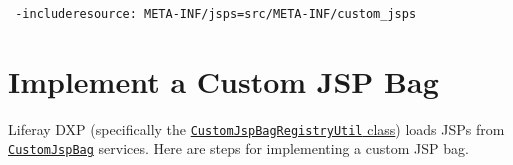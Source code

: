\begin{verbatim}
 -includeresource: META-INF/jsps=src/META-INF/custom_jsps
\end{verbatim}

\noindent\hrulefill

\section{Implement a Custom JSP Bag}\label{implement-a-custom-jsp-bag}

Liferay DXP (specifically the
\href{https://docs.liferay.com/dxp/portal/7.2-latest/javadocs/portal-impl/com/liferay/portal/deploy/hot/CustomJspBagRegistryUtil.html}{\texttt{CustomJspBagRegistryUtil}
class}) loads JSPs from
\href{https://docs.liferay.com/dxp/portal/7.2-latest/javadocs/portal-impl/com/liferay/portal/deploy/hot/CustomJspBag.html}{\texttt{CustomJspBag}}
services. Here are steps for implementing a custom JSP bag.

